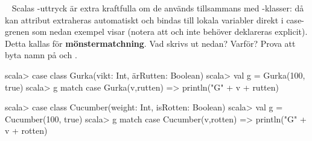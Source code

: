 \Task \label{task:match-caseclass} \what~   Scalas -uttryck är extra kraftfulla om de används tillsammans med -klasser: då kan attribut extraheras automatiskt och bindas till lokala variabler direkt i case-grenen som nedan exempel visar (notera att  och \ifswedish{}\else{}\fi{} inte behöver deklareras explicit). Detta kallas för \textbf{mönstermatchning}. 
Vad skrivs ut nedan? Varför? Prova att byta namn på  och \ifswedish{}\else{}\fi.
\ifswedish
\begin{REPL}
scala> case class Gurka(vikt: Int, ärRutten: Boolean)
scala> val g = Gurka(100, true)
scala> g match { case Gurka(v,rutten) => println("G" + v + rutten) }
\end{REPL}
\else
\begin{REPL}
scala> case class Cucumber(weight: Int, isRotten: Boolean)
scala> val g = Cucumber(100, true)
scala> g match { case Cucumber(v,rotten) => println("G" + v + rotten) }
\end{REPL}
\fi



